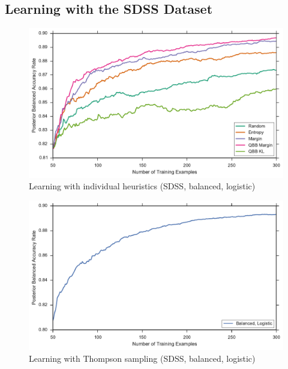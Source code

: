 \subsection{Learning with the SDSS Dataset}




\begin{figure}[p]
	\centering
	\includegraphics[width=\textwidth]{figures/5_active/sdss_bl_individuals}
	\caption[Learning with individual heuristics (SDSS, balanced, logistic)]{
		Learning with individual heuristics (SDSS, balanced, logistic)}
	\label{fig:sdss_bl_individuals}
\end{figure}

\begin{figure}[p]
	\centering
	\includegraphics[width=\textwidth]{figures/5_thompson/sdss_bl_thompson}
	\caption[Learning with Thompson sampling (SDSS, balanced, logistic)]{
		Learning with Thompson sampling (SDSS, balanced, logistic)}
	\label{fig:sdss_bl_thompson}
\end{figure}

